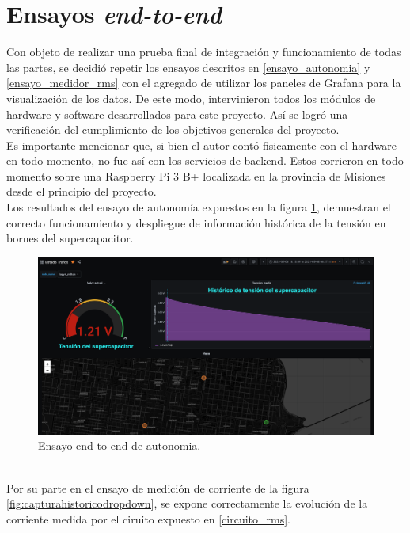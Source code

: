 \section{Ensayos \textit{end-to-end}}
Con objeto de realizar una prueba final de integraci\'{o}n y funcionamiento de todas las partes, se decidi\'{o} repetir los ensayos descritos en \ref{ensayo_autonomia} y \ref{ensayo_medidor_rms} con el agregado de utilizar los paneles de Grafana para la visualizaci\'{o}n de los datos. De este modo, intervinieron todos los m\'{o}dulos de hardware y software desarrollados para este proyecto. As\'{i} se logr\'{o} una verificaci\'{o}n del cumplimiento de los objetivos generales del proyecto.\\
Es importante mencionar que, si bien el autor cont\'{o} fisicamente con el hardware en todo momento, no fue as\'{i} con los servicios de backend. Estos corrieron en todo momento sobre una Raspberry Pi 3 B+ localizada en la provincia de Misiones desde el principio del proyecto.\\
Los resultados del ensayo de autonomía expuestos en la figura \ref{fig:e2esupercap}, demuestran el correcto funcionamiento y despliegue de informaci\'{o}n hist\'{o}rica de la tensión en bornes del supercapacitor.\\
\begin{figure}[h]
	\centering
	\includegraphics[width=1.0\linewidth]{Figures/e2e_supercap}
	\caption{Ensayo end to end de autonomia.}
	\label{fig:e2esupercap}
\end{figure}\\
Por su parte en el ensayo de medici\'{o}n de corriente de la figura \ref{fig:capturahistoricodropdown}, se expone correctamente la evoluci\'{o}n de la corriente medida por el ciruito expuesto en \ref{circuito_rms}.\\
